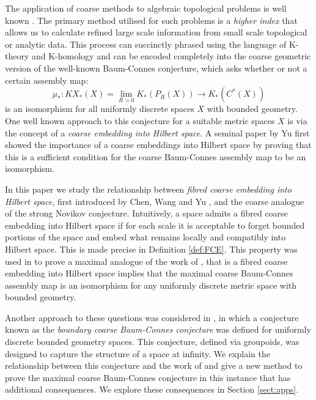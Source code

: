 \documentclass[preprint]{elsarticle}
\theoremstyle{plain}
\theoremstyle{definition}%
\theoremstyle{remark}%
\begin{document}
The application of coarse methods to algebraic topological problems is well known \cite{MR866507,MR1728880}. The primary method utilised for such problems is a \textit{higher index} that allows us to calculate refined large scale information from small scale topological or analytic data. This process can succinctly phrased using the language of K-theory and K-homology and can be encoded completely into the coarse geometric version of the well-known Baum-Connes conjecture, which asks whether or not a certain assembly map:
\begin{equation*}
\mu_{*}:KX_{*}(X)=\lim_{R>0}K_{*}(P_{R}(X)) \longrightarrow K_{*}(C^{*}(X))
\end{equation*}
is an isomorphism for all uniformly discrete spaces $X$ with bounded geometry. One well known approach to this conjecture for a suitable metric spaces $X$ is via the concept of a \textit{coarse embedding into Hilbert space}. A seminal paper by Yu \cite{MR1728880} first showed the importance of a coarse embeddings into Hilbert space by proving that this is a sufficient condition for the coarse Baum-Connes assembly map to be an isomorphism.

In this paper we study the relationship between \textit{fibred coarse embedding into Hilbert space}, first introduced by Chen, Wang and Yu \cite{FCEpaper}, and the coarse analogue of the strong Novikov conjecture. Intuitively, a space admits a fibred coarse embedding into Hilbert space if for each scale it is acceptable to forget bounded portions of the space and embed what remains locally and compatibly into Hilbert space. This is made precise in Definition \ref{def:FCE}. This property was used in \cite{FCEpaper} to prove a maximal analogue of the work of \cite{MR1728880}, that is a fibred coarse embedding into Hilbert space implies that the maximal coarse Baum-Connes assembly map is an isomorphism for any uniformly discrete metric space with bounded geometry.

Another approach to these questions was considered in \cite{mypub1}, in which a conjecture known as the \textit{boundary coarse Baum-Connes conjecture} was defined for uniformly discrete bounded geometry spaces. This conjecture, defined via groupoids, was designed to capture the structure of a space at infinity. We explain the relationship between this conjecture and the work of \cite{FCEpaper} and give a new method to prove the maximal coarse Baum-Connes conjecture in this instance that has additional consequences. We explore these consequences in Section \ref{sect:apps}.
\end{document}
